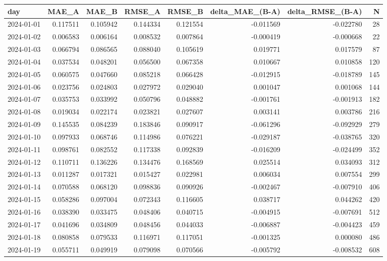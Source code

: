 \begin{tabular}{lrrrrrrr}
\toprule
day & MAE_A & MAE_B & RMSE_A & RMSE_B & delta_MAE_(B-A) & delta_RMSE_(B-A) & N \\
\midrule
2024-01-01 & 0.117511 & 0.105942 & 0.144334 & 0.121554 & -0.011569 & -0.022780 & 28 \\
2024-01-02 & 0.006583 & 0.006164 & 0.008532 & 0.007864 & -0.000419 & -0.000668 & 22 \\
2024-01-03 & 0.066794 & 0.086565 & 0.088040 & 0.105619 & 0.019771 & 0.017579 & 87 \\
2024-01-04 & 0.037534 & 0.048201 & 0.056500 & 0.067358 & 0.010667 & 0.010858 & 120 \\
2024-01-05 & 0.060575 & 0.047660 & 0.085218 & 0.066428 & -0.012915 & -0.018789 & 145 \\
2024-01-06 & 0.023756 & 0.024803 & 0.027972 & 0.029040 & 0.001047 & 0.001068 & 144 \\
2024-01-07 & 0.035753 & 0.033992 & 0.050796 & 0.048882 & -0.001761 & -0.001913 & 182 \\
2024-01-08 & 0.019034 & 0.022174 & 0.023821 & 0.027607 & 0.003141 & 0.003786 & 216 \\
2024-01-09 & 0.145535 & 0.084239 & 0.183846 & 0.090917 & -0.061296 & -0.092929 & 279 \\
2024-01-10 & 0.097933 & 0.068746 & 0.114986 & 0.076221 & -0.029187 & -0.038765 & 320 \\
2024-01-11 & 0.098761 & 0.082552 & 0.117338 & 0.092839 & -0.016209 & -0.024499 & 352 \\
2024-01-12 & 0.110711 & 0.136226 & 0.134476 & 0.168569 & 0.025514 & 0.034093 & 312 \\
2024-01-13 & 0.011287 & 0.017321 & 0.015427 & 0.022981 & 0.006034 & 0.007554 & 299 \\
2024-01-14 & 0.070588 & 0.068120 & 0.098836 & 0.090926 & -0.002467 & -0.007910 & 406 \\
2024-01-15 & 0.058286 & 0.097004 & 0.072343 & 0.116605 & 0.038717 & 0.044262 & 420 \\
2024-01-16 & 0.038390 & 0.033475 & 0.048406 & 0.040715 & -0.004915 & -0.007691 & 512 \\
2024-01-17 & 0.041696 & 0.034809 & 0.048456 & 0.044033 & -0.006887 & -0.004423 & 459 \\
2024-01-18 & 0.080858 & 0.079533 & 0.116971 & 0.117051 & -0.001325 & 0.000080 & 486 \\
2024-01-19 & 0.055711 & 0.049919 & 0.079098 & 0.070566 & -0.005792 & -0.008532 & 608 \\

\end{tabular}
